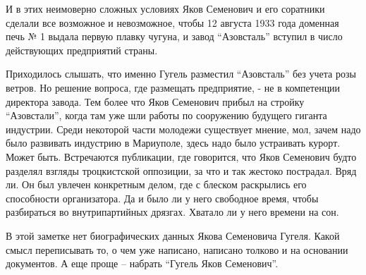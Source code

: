 И в этих неимоверно сложных условиях Яков Семенович и его соратники сделали все
возможное и невозможное, чтобы 12 августа 1933 года доменная печь № 1 выдала
первую плавку чугуна, и завод \enquote{Азовсталь} вступил в число действующих
предприятий страны. 

Приходилось слышать, что именно Гугель разместил \enquote{Азовсталь} без учета розы
ветров. Но решение  вопроса, где размещать предприятие, - не в компетенции
директора завода. Тем более что Яков Семенович прибыл на стройку \enquote{Азовстали},
когда там уже шли работы по сооружению будущего гиганта индустрии. Среди
некоторой части молодежи существует мнение, мол, зачем надо было развивать
индустрию в Мариуполе, здесь надо было устраивать курорт. Может быть.
Встречаются публикации, где говорится, что Яков Семенович будто разделял
взгляды троцкистской оппозиции, за что и так жестоко пострадал. Вряд ли. Он был
увлечен конкретным делом, где с блеском раскрылись его способности
организатора. Да и было ли у него свободное время, чтобы разбираться во
внутрипартийных дрязгах. Хватало ли у него времени на сон.

В этой заметке нет биографических данных Якова Семеновича Гугеля. Какой смысл
переписывать то, о чем уже написано, написано толково и на основании
документов. А еще проще – набрать \enquote{Гугель Яков Семенович}.
